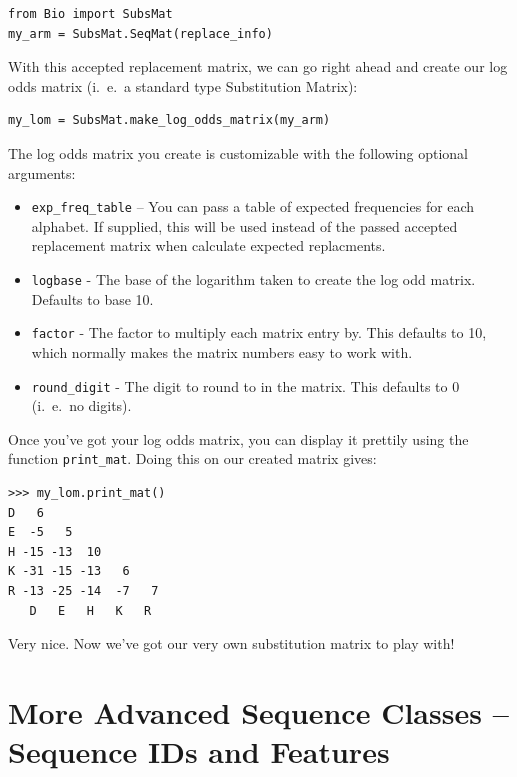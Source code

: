 \documentclass{report}
\begin{document}
\begin{verbatim}
from Bio import SubsMat
my_arm = SubsMat.SeqMat(replace_info)
\end{verbatim}

With this accepted replacement matrix, we can go right ahead and
create our log odds matrix (i.~e.~a standard type Substitution Matrix):

\begin{verbatim}
my_lom = SubsMat.make_log_odds_matrix(my_arm)
\end{verbatim}

The log odds matrix you create is customizable with the following
optional arguments:


\begin{itemize}
  \item \verb|exp_freq_table| -- You can pass a table of expected
  frequencies for each alphabet. If supplied, this will be used
  instead of the passed accepted replacement matrix when calculate
  expected replacments.


  \item \verb|logbase| - The base of the logarithm taken to create the
  log odd matrix. Defaults to base 10.


  \item \verb|factor| - The factor to multiply each matrix entry
  by. This defaults to 10, which normally makes the matrix numbers
  easy to work with.


  \item \verb|round_digit| - The digit to round to in the matrix. This
  defaults to 0 (i.~e.~no digits).

\end{itemize}

Once you've got your log odds matrix, you can display it prettily
using the function \verb|print_mat|. Doing this on our created matrix
gives:

\begin{verbatim}
>>> my_lom.print_mat()
D   6
E  -5   5
H -15 -13  10
K -31 -15 -13   6
R -13 -25 -14  -7   7
   D   E   H   K   R
\end{verbatim}

Very nice. Now we've got our very own substitution matrix to play with!

\section{More Advanced Sequence Classes -- Sequence IDs and Features}
\label{sec:advanced-seq}
\end{document}
